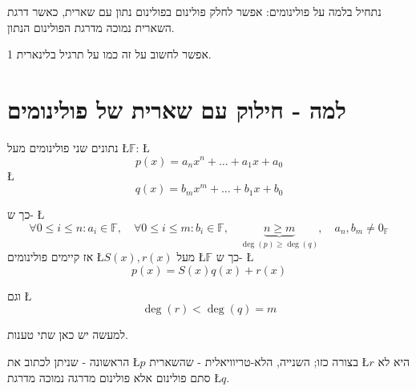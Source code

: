 \documentclass[english,hebrew]{article}
\begin{document}
נתחיל בלמה על פולינומים: אפשר לחלק פולינום בפולינום נתון עם שארית,
כאשר דרגת השארית נמוכה מדרגת הפולינום הנתון.

אפשר לחשוב על זה כמו על תרגיל בלינארית 1.

\section{למה - חילוק עם שארית של פולינומים}

נתונים שני פולינומים מעל \L{$\mathbb{F}$}: \L{%
\[
p(x)=a_{n}x^{n}+\dots+a_{1}x+a_{0}
\]
}%
\L{%
\[
q(x)=b_{m}x^{m}+\dots+b_{1}x+b_{0}
\]
}%

כך ש- \L{%
\[
\forall0\le i\le n:a_{i}\in\mathbb{F},\quad\forall0\le i\le m:b_{i}\in\mathbb{F},\quad\underset{\deg\left(p\right)\ge\deg\left(q\right)}{\underbrace{n\ge m}},\quad a_{n},b_{m}\ne0_{\mathbb{F}}
\]
}%
אז קיימים פולינומים \L{$S(x),r(x)$} מעל \L{$\mathbb{F}$} כך ש- \L{%
\[
p(x)=S(x)q(x)+r(x)
\]
}%

וגם \L{%
\[
\deg(r)<\deg(q)=m
\]
}%

למעשה יש כאן שתי טענות.

הראשונה - שניתן לכתוב את \L{$p$} בצורה כזו; השנייה, הלא-טריוויאלית
- שהשארית \L{$r$} היא לא סתם פולינום אלא פולינום מדרגה נמוכה מדרגת
\L{$q$}.
\end{document}
